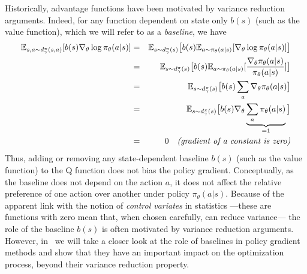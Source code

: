 Historically, advantage functions have been motivated by variance reduction arguments. Indeed, for any function dependent on state only $b(s)$ (such as the value function), which we will refer to as a \textit{baseline}, we have
\begin{eqnarray*}
    \mathbb{E}_{s, a \sim d^\pi_\gamma(s,a)} [ b(s) \nabla_\theta \log \pi_\theta(a|s)] &=& \mathbb{E}_{s \sim d^\pi_\gamma(s)} \big[ b(s)   \mathbb{E}_{a \sim \pi_\theta(a|s)} [ \nabla_\theta \log \pi_\theta(a|s)] \big]\\
    &=&  \mathbb{E}_{s \sim d^\pi_\gamma(s)} \big[ b(s)  \mathbb{E}_{a \sim \pi_\theta(a|s)} [  \frac{\nabla_\theta \pi_\theta(a|s)} {\pi_\theta(a|s)}]\big] \\
    &=&  \mathbb{E}_{s \sim d^\pi_\gamma(s)} \big[ b(s)  \sum_a \nabla_\theta \pi_\theta(a|s)\big] \\
     &=&  \mathbb{E}_{s \sim d^\pi_\gamma(s)} \big[ b(s) \nabla_\theta  \underbrace{\sum_a \pi_\theta(a|s)}_{=1}\big]\\
     &=& 0 \quad \textit{(gradient of a constant is zero)}\\
\end{eqnarray*}
Thus, adding or removing any state-dependent baseline $b(s)$ (such as the value function) to the Q function does not bias the policy gradient. Conceptually, as the baseline does not depend on the action $a$, it does not affect the relative preference of one action over another under policy $\pi_\theta(a|s)$. %
Because of the apparent link with the notion of \textit{control variates} in statistics —these are functions with zero mean that, when chosen carefully, can reduce variance— the role of the baseline $b(s)$ is often motivated by variance reduction arguments. However, in~ we will take a closer look at the role of baselines in policy gradient methods and show that they have an important impact on the optimization process, beyond their variance reduction property.



